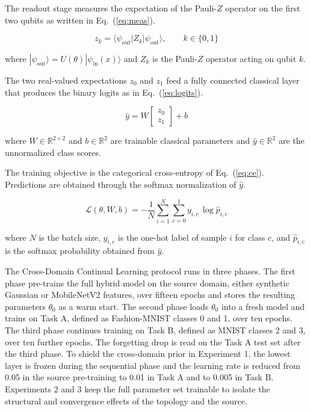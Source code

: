 \documentclass[runningheads]{llncs}
\begin{document}
The readout stage measures the expectation of the Pauli-$Z$ operator on the first two qubits as written in Eq.~(\ref{eq:meas}).

\begin{equation}
z_k = \langle \psi_{\text{out}} | Z_k | \psi_{\text{out}} \rangle, \qquad k\in\{0,1\}
\label{eq:meas}
\end{equation}

where $|\psi_{\text{out}}\rangle = U(\theta)|\psi_{\text{in}}(x)\rangle$ and $Z_k$ is the Pauli-$Z$ operator acting on qubit $k$.

The two real-valued expectations $z_0$ and $z_1$ feed a fully connected classical layer that produces the binary logits as in Eq.~(\ref{eq:logits}).

\begin{equation}
\hat{y} = W\begin{bmatrix} z_0 \\ z_1 \end{bmatrix} + b
\label{eq:logits}
\end{equation}

where $W\in\mathbb{R}^{2\times 2}$ and $b\in\mathbb{R}^{2}$ are trainable classical parameters and $\hat{y}\in\mathbb{R}^{2}$ are the unnormalized class scores.

The training objective is the categorical cross-entropy of Eq.~(\ref{eq:ce}). Predictions are obtained through the softmax normalization of $\hat{y}$.

\begin{equation}
\mathcal{L}(\theta,W,b) = -\frac{1}{N}\sum_{i=1}^{N}\sum_{c=0}^{1} y_{i,c}\,\log \hat{p}_{i,c}
\label{eq:ce}
\end{equation}

where $N$ is the batch size, $y_{i,c}$ is the one-hot label of sample $i$ for class $c$, and $\hat{p}_{i,c}$ is the softmax probability obtained from $\hat{y}$.

The Cross-Domain Continual Learning protocol runs in three phases. The first phase pre-trains the full hybrid model on the source domain, either synthetic Gaussian or MobileNetV2 features, over fifteen epochs and stores the resulting parameters $\theta_0$ as a warm start. The second phase loads $\theta_0$ into a fresh model and trains on Task A, defined as Fashion-MNIST classes 0 and 1, over ten epochs. The third phase continues training on Task B, defined as MNIST classes 2 and 3, over ten further epochs. The forgetting drop is read on the Task A test set after the third phase. To shield the cross-domain prior in Experiment 1, the lowest layer is frozen during the sequential phase and the learning rate is reduced from 0.05 in the source pre-training to 0.01 in Task A and to 0.005 in Task B. Experiments 2 and 3 keep the full parameter set trainable to isolate the structural and convergence effects of the topology and the source.
\end{document}
